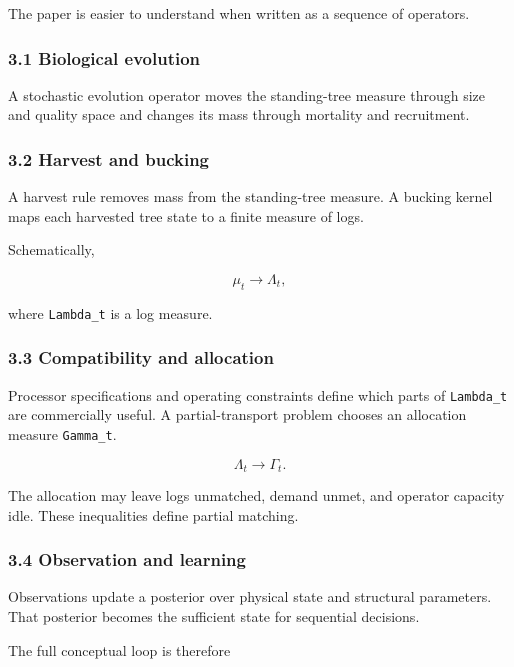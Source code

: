 The paper is easier to understand when written as a sequence of operators.

\subsubsection{3.1 Biological evolution}\label{biological-evolution}

A stochastic evolution operator moves the standing-tree measure through size and
quality space and changes its mass through mortality and recruitment.

\subsubsection{3.2 Harvest and bucking}\label{harvest-and-bucking}

A harvest rule removes mass from the standing-tree measure. A bucking kernel
maps each harvested tree state to a finite measure of logs.

Schematically,

\[
\mu_t \longrightarrow \Lambda_t,
\]

where \texttt{Lambda\_t} is a log measure.

\subsubsection{3.3 Compatibility and allocation}\label{compatibility-and-allocation}

Processor specifications and operating constraints define which parts of
\texttt{Lambda\_t} are commercially useful. A partial-transport problem chooses an
allocation measure \texttt{Gamma\_t}.

\[
\Lambda_t \longrightarrow \Gamma_t.
\]

The allocation may leave logs unmatched, demand unmet, and operator capacity
idle. These inequalities define partial matching.

\subsubsection{3.4 Observation and learning}\label{observation-and-learning}

Observations update a posterior over physical state and structural parameters.
That posterior becomes the sufficient state for sequential decisions.

The full conceptual loop is therefore

\begin{Shaded}
\begin{Highlighting}[]
\end{Highlighting}
\end{Shaded}

